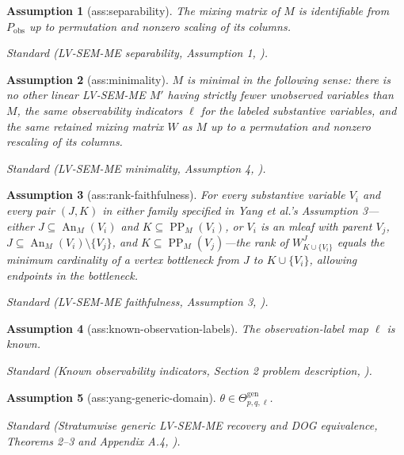 \documentclass{article}
\newtheorem{assumption}{Assumption}
\begin{document}
\begin{assumption}[ass:separability]\label{ass:separability}
The mixing matrix of \(M\) is identifiable from \(P_{\mathrm{obs}}\) up to permutation and nonzero scaling of its columns.
\par\smallskip\noindent\emph{Standard} (LV-SEM-ME separability, Assumption 1, \cite{YangNafeaKiyavashZhangGhassami2026}).
\end{assumption}

\begin{assumption}[ass:minimality]\label{ass:minimality}
\(M\) is minimal in the following sense: there is no other linear LV-SEM-ME \(M'\) having strictly fewer unobserved variables than \(M\), the same observability indicators \(\ell\) for the labeled substantive variables, and the same retained mixing matrix \(W\) as \(M\) up to a permutation and nonzero rescaling of its columns.
\par\smallskip\noindent\emph{Standard} (LV-SEM-ME minimality, Assumption 4, \cite{YangNafeaKiyavashZhangGhassami2026}).
\end{assumption}

\begin{assumption}[ass:rank-faithfulness]\label{ass:rank-faithfulness}
For every substantive variable \(V_i\) and every pair \((J,K)\) in either family specified in Yang et al.'s Assumption 3—either \(J\subseteq\operatorname{An}_M(V_i)\) and \(K\subseteq\operatorname{PP}_M(V_i)\), or \(V_i\) is an mleaf with parent \(V_j\), \(J\subseteq\operatorname{An}_M(V_i)\setminus\{V_j\}\), and \(K\subseteq\operatorname{PP}_M(V_j)\)—the rank of \(W^J_{K\cup\{V_i\}}\) equals the minimum cardinality of a vertex bottleneck from \(J\) to \(K\cup\{V_i\}\), allowing endpoints in the bottleneck.
\par\smallskip\noindent\emph{Standard} (LV-SEM-ME faithfulness, Assumption 3, \cite{YangNafeaKiyavashZhangGhassami2026}).
\end{assumption}

\begin{assumption}[ass:known-observation-labels]\label{ass:known-observation-labels}
The observation-label map \(\ell\) is known.
\par\smallskip\noindent\emph{Standard} (Known observability indicators, Section 2 problem description, \cite{YangNafeaKiyavashZhangGhassami2026}).
\end{assumption}

\begin{assumption}[ass:yang-generic-domain]\label{ass:yang-generic-domain}
\(\theta\in\Theta_{p,q,\ell}^{\mathrm{gen}}\).
\par\smallskip\noindent\emph{Standard} (Stratumwise generic LV-SEM-ME recovery and DOG equivalence, Theorems 2--3 and Appendix A.4, \cite{YangNafeaKiyavashZhangGhassami2026}).
\end{assumption}
\end{document}

